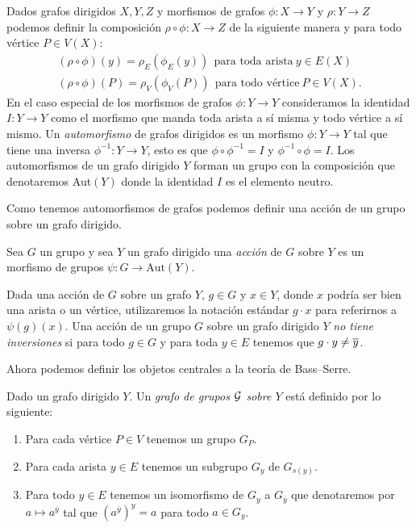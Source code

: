 \documentclass[tesis.tex]{subfiles}
\begin{document}
Dados grafos dirigidos $X,Y,Z$ y morfismos de grafos $\phi:X \to Y$ y $\rho:Y \to Z$ podemos definir la composición $\rho \circ \phi : X \to Z$ de la siguiente manera  y para todo vértice $P \in V(X)$:
\begin{align*}
	(\rho \circ \phi) (y) = \rho_{E} (\phi_{E} (y)) \  \ \text{para toda arista} \ y \in E(X) \\
	(\rho \circ \phi) (P) = \rho_{V} (\phi_{V} (P)) \  \ \text{para todo vértice} \ P \in V(X). 
\end{align*}
En el caso especial de los morfismos de grafos $\phi: Y \to Y$ consideramos la identidad $I: Y \to Y$ como el morfismo que manda toda arista a sí misma y todo vértice a sí mismo.
Un \emph{automorfismo} de grafos dirigidos es un morfismo $\phi:Y \to Y$ tal que tiene una inversa $\phi^{-1}:Y \to Y$, esto es que $\phi \circ \phi^{-1} = I$ y $\phi^{-1} \circ \phi = I$.
Los automorfismos de un grafo dirigido $Y$ forman un grupo con la composición que denotaremos Aut$(Y)$ donde la identidad $I$ es el elemento neutro.

Como tenemos automorfismos de grafos podemos definir una acción de un grupo sobre un grafo dirigido.
\begin{deff}
	Sea $G$ un grupo y sea $Y$ un grafo dirigido una \emph{acción} de $G$ sobre $Y$ es un morfismo de grupos $\psi: G \to \text{Aut}(Y)$.
	
\end{deff}

Dada una acción de $G$ sobre un grafo $Y$, $g \in G$ y $x \in Y$, donde $x$ podría ser bien una arista o un vértice, utilizaremos la notación estándar $g \cdot x$ para referirnos a $\psi(g)(x)$.
Una acción de un grupo $G$ sobre un grafo dirigido $Y$ \emph{no tiene inversiones} si para todo $g \in G$ y para toda $y \in E$ tenemos que $g \cdot y \neq \overline y$.


Ahora podemos definir los objetos centrales a la teoría de Bass--Serre.

\begin{deff}
	Dado un grafo dirigido $Y$.
	Un \emph{grafo de grupos $\cal G$ sobre $Y$} está definido por lo siguiente:
	\begin{enumerate}
		\item Para cada vértice $P \in V$ tenemos un grupo $G_P$.
		\item  Para cada arista $y \in E$ tenemos un subgrupo $G_y$ de $G_{s(y)}$.
		\item Para todo $y \in E$ tenemos un isomorfismo de $G_y$ a $G_{\overline y}$ que denotaremos por $a \mapsto a^{\overline y} $ tal que $(a^{\overline y})^y  = a$ para todo $a \in G_y$.
	\end{enumerate}
\end{deff}
\end{document}
